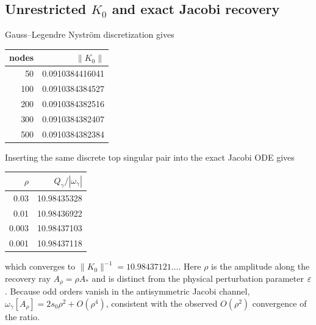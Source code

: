 \subsection{\texorpdfstring{Unrestricted $K_0$ and exact Jacobi recovery}{Unrestricted K0 and exact Jacobi recovery}}
Gauss--Legendre Nystr\"om discretization gives
\begin{center}
\begin{tabular}{rr}
\toprule
nodes & $\|K_0\|$\\
\midrule
50&0.0910384416041\\
100&0.0910384384527\\
200&0.0910384382516\\
300&0.0910384382407\\
500&0.0910384382384\\
\bottomrule
\end{tabular}
\end{center}
Inserting the same discrete top singular pair into the exact Jacobi ODE gives
\begin{center}
\begin{tabular}{rr}
\toprule
$\rho$ & $Q_\gamma/|\omega_\gamma|$\\
\midrule
0.03&10.98435328\\
0.01&10.98436922\\
0.003&10.98437103\\
0.001&10.98437118\\
\bottomrule
\end{tabular}
\end{center}
which converges to $\|K_0\|^{-1}=10.98437121\ldots$. Here $\rho$ is the amplitude along the recovery ray $A_\rho=\rho A_*$ and is distinct from the physical perturbation parameter $\varepsilon$. Because odd orders vanish in the antisymmetric Jacobi channel, $\omega_\gamma[A_\rho]=2s_0\rho^2+O(\rho^4)$, consistent with the observed $O(\rho^2)$ convergence of the ratio.

